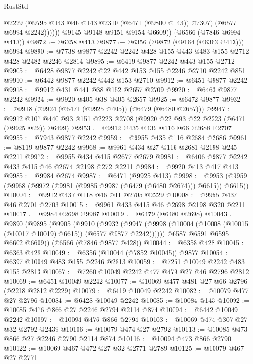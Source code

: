 \begin{lexlean}{RustStd}
\begin{coremodule}
{\begin{coremodule}
{{{{{{{{{{{{{{{{{{{{{{{{{{                  @2229
                  (@9795 @143 @46 @143 @2310 (@6471 (@9800 @143)) @7307)
                  (@6577 @6994 @2242))))))
        @9145
        @9148
        @9151
        @9154
        @6609))
    (@6566 (@7846 @6994 @413))
@9872 := @6358 @413
@9877 := @6356 (@9872 (@9164 (@6363 @413))) @6994
@9890 := @7738 @9877 @2242 @2242 @428 @155 @443 @483 @155 @2712 @428 @2482 @2246 @2814
@9895 := @6419 @9877 @2242 @443 @155 @2712
@9905 := @6428 @9877 @2242 @22 @442 @153 @155 @2246 @2710 @2242 @851
@9910 := @6442 @9877 @2242 @442 @153 @2710
@9912 := @6451 @9877 @2242
@9918 := @9912 @431 @441 @38 @152 @2657 @2709
@9920 := @6463 @9877 @2242
@9924 := @9920 @405 @38 @405 @2657
@9925 := @6472 @9877
@9932 := @9918 (@9924 (@6471 (@9925 @405)) (@6479 (@6480 @2657)))
@9947 := @9912 @107 @440 @93 @151 @2223 @2708 (@9920 @22 @93 @22 @2223 (@6471 (@9925 @22)) @6499)
@9953 := @9912 @435 @439 @116 @66 @2688 @2707
@9955 := @7943 @9877 @2242
@9959 := @9955 @435 @116 @2684 @2686
@9961 := @8119 @9877 @2242
@9968 := @9961 @434 @27 @116 @2681 @2198 @245 @2211
@9972 := @9955 @434 @415 @2677 @2679
@9981 := @6406 @9877 @2242 @433 @415 @46 @2674 @2198 @272 @2211
@9984 := @9920 @413 @417 @413
@9985 := @9984 @2674
@9987 := @6471 (@9925 @413)
@9998 := @9953 (@9959 (@9968 (@9972 (@9981 (@9985 @9987 (@6479 (@6480 @2674))) @6615)) @6615))
@10004 := @9912 @437 @118 @46 @11 @2705 @2229
@10008 := @9955 @437 @46 @2701 @2703
@10015 := @9961 @433 @415 @46 @2698 @2198 @320 @2211
@10017 := @9984 @2698 @9987
@10019 := @6479 (@6480 @2698)
@10043 := @9890
    (@9895
      (@9905
        (@9910
          (@9932
            (@9947 (@9998 (@10004 (@10008 (@10015 (@10017 @10019) @6615)) (@6577 @9877 @2242))))))
        @6587
        @6591
        @6595
        @6602
        @6609))
    (@6566 (@7846 @9877 @428))
@10044 := @6358 @428
@10045 := @6363 @428
@10049 := @6356 (@10044 (@7852 @10045)) @9877
@10054 := @6397 @10049 @483 @155 @2246 @2813
@10059 := @7251 @10049 @2242 @483 @155 @2813
@10067 := @7260 @10049 @2242 @477 @479 @27 @46 @2796 @2812
@10069 := @6451 @10049 @2242
@10077 := @10069 @477 @481 @27 @66 @2796 (@2218 @2812 @2229)
@10079 := @6419 @10049 @2242
@10082 := @10079 @477 @27 @2796
@10084 := @6428 @10049 @2242
@10085 := @10084 @143
@10092 := @10085 @476 @866 @27 @2246 @2794 @2114 @874
@10094 := @6442 @10049 @2242
@10097 := @10094 @476 @866 @2794
@10103 := @10069 @474 @307 @27 @32 @2792 @2439
@10106 := @10079 @474 @27 @2792
@10113 := @10085 @473 @866 @27 @2246 @2790 @2114 @874
@10116 := @10094 @473 @866 @2790
@10122 := @10069 @467 @472 @27 @32 @2771 @2789
@10125 := @10079 @467 @27 @2771
}}}}}}}}}}}}}}}}}}}}}}}}}}
\end{coremodule}}
\end{coremodule}
\end{lexlean}
